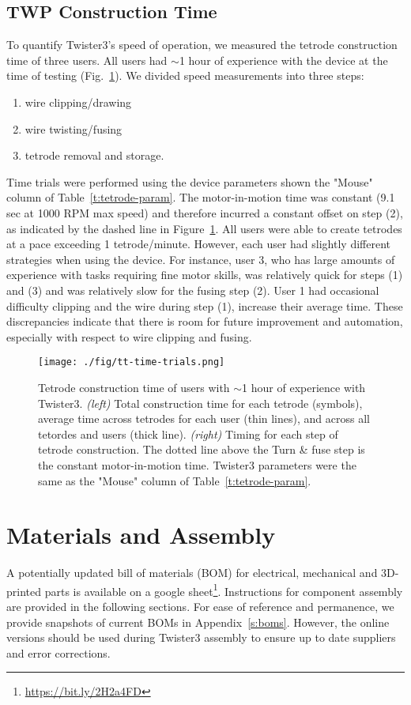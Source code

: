 \documentclass[11pt,a4paper]{article}
\begin{document}
\subsection{TWP Construction Time}
To quantify Twister3's speed of operation, we measured the tetrode construction
time of three users. All users had $\sim$1 hour of experience with the device
at the time of testing (Fig.~\ref{f:tt-time}). We divided speed measurements
into three steps:
\begin{enumerate}[noitemsep]
    \item wire clipping/drawing
    \item wire twisting/fusing
    \item tetrode removal and storage. 
\end{enumerate}
Time trials were performed using the device  parameters shown the "Mouse"
column of Table~\ref{t:tetrode-param}. The motor-in-motion time was constant
(9.1 sec at 1000 RPM max speed) and therefore incurred a constant offset on
step (2), as indicated by the dashed line in Figure~\ref{f:tt-time}. All users
were able to create tetrodes at a pace exceeding 1 tetrode/minute. However,
each user had slightly different strategies when using the device. For
instance, user 3, who has large amounts of experience with tasks requiring fine
motor skills, was relatively quick for steps (1) and (3) and was relatively
slow for the fusing step (2).  User 1 had occasional difficulty clipping and
the wire during step (1), increase their average time. These discrepancies
indicate that there is room for future improvement and automation, especially
with respect to wire clipping and fusing.

\begin{figure}
\centering
\texttt{[image: ./fig/tt-time-trials.png]}
\caption{
    Tetrode construction time of users with $\sim$1 hour of experience with
    Twister3. \textit{(left)} Total construction time for each tetrode
    (symbols), average time across tetrodes for each user (thin lines), and across all tetordes and users (thick
    line). \textit{(right)} Timing for each step of tetrode construction.
    The dotted line above the Turn \& fuse step is the constant motor-in-motion
    time. Twister3 parameters were the same as the "Mouse" column of
    Table~\ref{t:tetrode-param}. 
}
\label{f:tt-time}
\end{figure}

\section{Materials and Assembly}
A potentially updated bill of materials (BOM) for electrical, mechanical and
3D-printed parts is available on a google
sheet\footnote{\url{https://bit.ly/2H2a4FD}}. Instructions for component assembly are
provided in the following sections. For ease of reference and permanence, we
provide snapshots of current BOMs in Appendix~\ref{s:boms}. However, the online
versions should be used during Twister3 assembly to ensure up to date suppliers
and error corrections.
\end{document}
